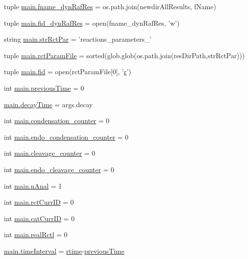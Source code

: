 \begin{DoxyCompactItemize}
\item 
tuple \hyperlink{a00153_a6a031fb0c5a0a5519fc4c3f6d7ef35d1}{main.\+fname\+\_\+dyn\+Raf\+Res} = os.\+path.\+join(newdir\+All\+Results, f\+Name)
\item 
tuple \hyperlink{a00153_aaff6b4fb4c2e2089c2a207a12f1757e3}{main.\+fid\+\_\+dyn\+Raf\+Res} = open(fname\+\_\+dyn\+Raf\+Res, 'w')
\item 
string \hyperlink{a00153_af48af84bff2351a55727aba6a63c1b52}{main.\+str\+Rct\+Par} = 'reactions\+\_\+parameters\+\_\+'
\item 
tuple \hyperlink{a00153_ac4e9cba2fd0b813ba19029541ad609e5}{main.\+rct\+Param\+File} = sorted(glob.\+glob(os.\+path.\+join(res\+Dir\+Path,str\+Rct\+Par)))
\item 
tuple \hyperlink{a00153_a68ab0ffa4b5ff1cceff01f4abe686ad0}{main.\+fid} = open(rct\+Param\+File\mbox{[}0\mbox{]}, '\hyperlink{a00031_ac862e7284527eb913b1351c8bfb8e079}{r}')
\item 
int \hyperlink{a00153_a6a6de947e3b6ada5ea6e761d208228bd}{main.\+previous\+Time} = 0
\item 
\hyperlink{a00153_a5517c07ae046c271d6291e9b3f7d139d}{main.\+decay\+Time} = args.\+decay
\item 
int \hyperlink{a00153_a358b60986e7e25df0dfb61562b7aa3e2}{main.\+condensation\+\_\+counter} = 0
\item 
int \hyperlink{a00153_a0521d81d319c4d79433b5fb65a6da1c2}{main.\+endo\+\_\+condensation\+\_\+counter} = 0
\item 
int \hyperlink{a00153_aba28788973ae3e9140b53078efe5d204}{main.\+cleavage\+\_\+counter} = 0
\item 
int \hyperlink{a00153_a17b22b48a2afe0223186b4275fe5ba70}{main.\+endo\+\_\+cleavage\+\_\+counter} = 0
\item 
int \hyperlink{a00153_ae7ca1c378927da05feb71e5a9f775afb}{main.\+n\+Anal} = 1
\item 
int \hyperlink{a00153_a53e397dea15f17442a198395e65b377b}{main.\+rct\+Curr\+I\+D} = 0
\item 
int \hyperlink{a00153_aa56c55225fa65fa569bd8d5f1063550e}{main.\+cat\+Curr\+I\+D} = 0
\item 
int \hyperlink{a00153_a2dcb93d1b24fce96491e031528ed43c0}{main.\+real\+Rctl} = 0
\item 
\hyperlink{a00153_a5ba0cd0b7538ed8047b2fea322ecb4b7}{main.\+time\+Interval} = \hyperlink{a00028_afc6b38657a313b9f1de2ee356910b6ee}{rtime}-\/\hyperlink{a00028_a17b8652a085b5add031a40fb1c9a680e}{previous\+Time}
\item 

\end{DoxyCompactItemize}
